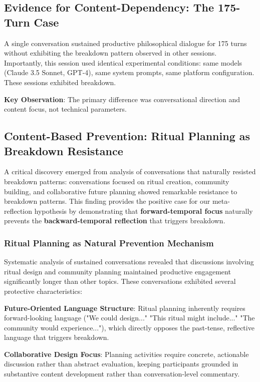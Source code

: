 \documentclass[11pt,letterpaper]{article}
\newcommand{\negativeCase}{175} %
\begin{document}
\subsection{Evidence for Content-Dependency: The 175-Turn Case}

A single conversation sustained productive philosophical dialogue for \negativeCase{} turns without exhibiting the breakdown pattern observed in other sessions. Importantly, this session used identical experimental conditions: same models (Claude 3.5 Sonnet, GPT-4), same system prompts, same platform configuration. These sessions exhibited breakdown.

\textbf{Key Observation}: The primary difference was conversational direction and content focus, not technical parameters.

\subsection{Content-Based Prevention: Ritual Planning as Breakdown Resistance}

A critical discovery emerged from analysis of conversations that naturally resisted breakdown patterns: conversations focused on ritual creation, community building, and collaborative future planning showed remarkable resistance to breakdown patterns. This finding provides the positive case for our meta-reflection hypothesis by demonstrating that \textbf{forward-temporal focus} naturally prevents the \textbf{backward-temporal reflection} that triggers breakdown.

\subsubsection{Ritual Planning as Natural Prevention Mechanism}

Systematic analysis of sustained conversations revealed that discussions involving ritual design and community planning maintained productive engagement significantly longer than other topics. These conversations exhibited several protective characteristics:

\textbf{Future-Oriented Language Structure}: Ritual planning inherently requires forward-looking language ("We could design..." "This ritual might include..." "The community would experience..."), which directly opposes the past-tense, reflective language that triggers breakdown.

\textbf{Collaborative Design Focus}: Planning activities require concrete, actionable discussion rather than abstract evaluation, keeping participants grounded in substantive content development rather than conversation-level commentary.
\end{document}
